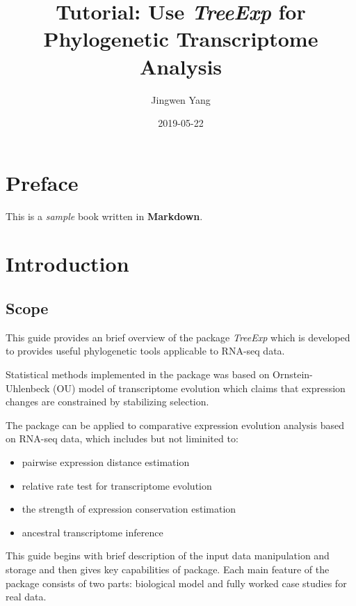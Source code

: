 \documentclass[]{book}
\title{Tutorial: Use \emph{TreeExp} for Phylogenetic Transcriptome Analysis}
\author{Jingwen Yang}
\date{2019-05-22}
\providecommand{\tightlist}{%
  \setlength{\itemsep}{0pt}\setlength{\parskip}{0pt}}
\begin{document}
\maketitle

{
\setcounter{tocdepth}{1}
\tableofcontents
}
\hypertarget{preface}{%
\chapter{Preface}\label{preface}}

This is a \emph{sample} book written in \textbf{Markdown}.

\hypertarget{introduction}{%
\chapter{Introduction}\label{introduction}}

\hypertarget{scope}{%
\section{Scope}\label{scope}}

This guide provides an brief overview of the package \emph{TreeExp} which is developed to provides useful phylogenetic tools applicable to RNA-seq data.

Statistical methods implemented in the package was based on Ornstein-Uhlenbeck (OU) model of transcriptome evolution which claims that expression changes are constrained by stabilizing selection.

The package can be applied to comparative expression evolution analysis based on RNA-seq data, which includes but not liminited to:

\begin{itemize}
\tightlist
\item
  pairwise expression distance estimation
\item
  relative rate test for transcriptome evolution
\item
  the strength of expression conservation estimation
\item
  ancestral transcriptome inference
\end{itemize}

This guide begins with brief description of the input data manipulation and storage and then gives key capabilities of package. Each main feature of the package consists of two parts: biological model and fully worked case studies for real data.

\newpage
\end{document}
